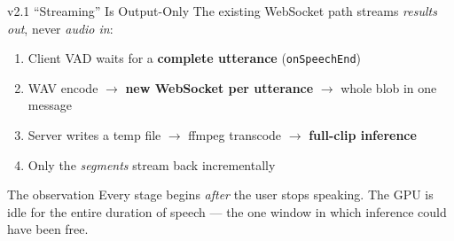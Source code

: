 \documentclass{beamer}
\begin{document}
\begin{frame}{v2.1 ``Streaming'' Is Output-Only}
    \small
    The existing WebSocket path streams \emph{results out}, never \emph{audio in}:

    \vspace{0.4em}
    \begin{enumerate}\setlength{\itemsep}{2pt}
        \item Client VAD waits for a \textbf{complete utterance} (\texttt{onSpeechEnd})
        \item WAV encode $\rightarrow$ \textbf{new WebSocket per utterance} $\rightarrow$
              whole blob in one message
        \item Server writes a temp file $\rightarrow$ ffmpeg transcode $\rightarrow$
              \textbf{full-clip inference}
        \item Only the \emph{segments} stream back incrementally
    \end{enumerate}

    \vspace{0.5em}
    \begin{block}{The observation}
        Every stage begins \emph{after} the user stops speaking. The GPU is idle for
        the entire duration of speech --- the one window in which inference could
        have been free.
    \end{block}
\end{frame}
\end{document}
